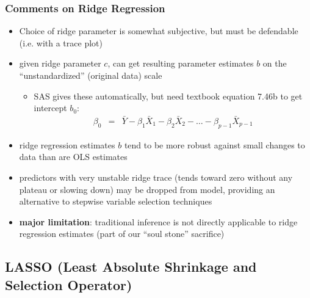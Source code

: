 \documentclass[12pt]{../notes}
\begin{document}

\subsubsection{Comments on Ridge Regression}
\begin{itemize}
  \item Choice of ridge parameter is somewhat subjective, but must be defendable (i.e. with a trace plot)
  \item given ridge parameter $c$, can get resulting parameter estimates ${b}$ on the ``unstandardized'' (original data) scale
      \begin{itemize}
        \item SAS gives these automatically, but need textbook equation 7.46b to get intercept $b_0$:
             \begin{eqnarray}
               \beta_0 & = & \bar{Y} - \beta_1 \bar{X}_1 - \beta_2 \bar{X}_2 - \ldots - \beta_{p-1} \bar{X}_{p-1} \nonumber
             \end{eqnarray}
      \end{itemize}
  \item ridge regression estimates ${b}$ tend to be more robust against small changes to data than are OLS estimates
  \item predictors with very unstable ridge trace (tends toward zero without any plateau or slowing down) may be dropped from model, providing an alternative to stepwise variable selection techniques
\item {\bf major limitation}: traditional inference is not directly applicable to ridge regression estimates (part of our ``soul stone'' sacrifice)\\
\end{itemize}

\subsection{LASSO (Least Absolute Shrinkage and Selection Operator)}
\end{document}
